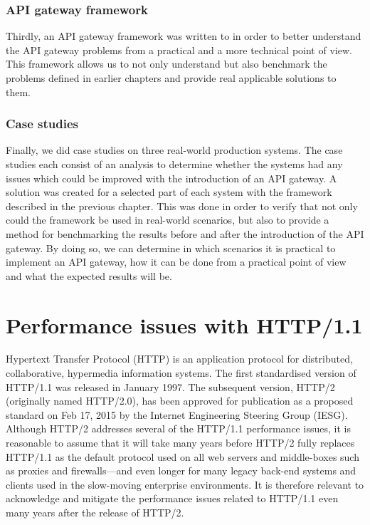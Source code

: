 \documentclass{cslthse-msc}
\begin{document}
\subsection{API gateway framework}
Thirdly, an API gateway framework was written to in order to better understand the API gateway problems from a practical and a more technical point of view. This framework allows us to not only understand but also benchmark the problems defined in earlier chapters and provide real applicable solutions to them.

\subsection{Case studies}
Finally, we did case studies on three real-world production systems. The case studies each consist of an analysis to determine whether the systems had any issues which could be improved with the introduction of an API gateway. A solution was created for a selected part of each system with the framework described in the previous chapter. This was done in order to verify that not only could the framework be used in real-world scenarios, but also to provide a method for benchmarking the results before and after the introduction of the API gateway. By doing so, we can determine in which scenarios it is practical to implement an API gateway, how it can be done from a practical point of view and what the expected results will be.

\chapter{Performance issues with HTTP/1.1}
Hypertext Transfer Protocol (HTTP) is an application protocol for distributed, collaborative, hypermedia information systems\cite{rfc2616}. The first standardised version of HTTP/1.1 was released in January 1997\cite{rfc2068}. The subsequent version, HTTP/2 (originally named HTTP/2.0), has been approved for publication as a proposed standard on Feb 17, 2015 by the Internet Engineering Steering Group (IESG). Although HTTP/2 addresses several of the HTTP/1.1 performance issues, it is reasonable to assume that it will take many years before HTTP/2 fully replaces HTTP/1.1 as the default protocol used on all web servers and middle-boxes such as proxies and firewalls---and even longer for many legacy back-end systems and clients used in the slow-moving enterprise environments. It is therefore relevant to acknowledge and mitigate the performance issues related to HTTP/1.1 even many years after the release of HTTP/2.
\end{document}
